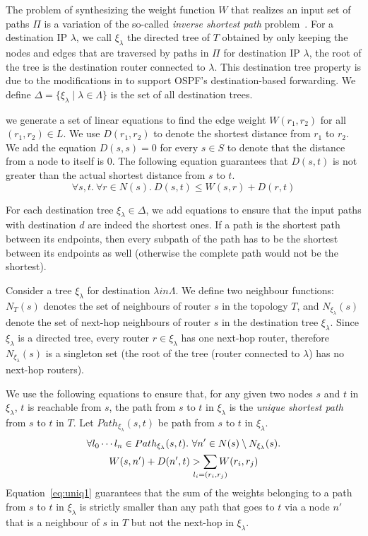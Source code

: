 The problem of synthesizing the weight function $W$ that
realizes an input set of paths $\Pi$ is
a
variation of the so-called {\em inverse shortest path} 
problem~\cite{isp}. 
For a destination IP $\lambda$, we call $\xi_\lambda$ 
the directed tree of $T$ 
obtained by only keeping the nodes and edges 
that are traversed by paths in $\Pi$ for 
destination IP $\lambda$, the root of the tree
is the destination router connected to $\lambda$. 
 This destination tree
 property is due to the modifications in \genesis
 to support OSPF's destination-based forwarding. We
 define $\Delta=\{\xi_\lambda\mid \lambda \in \Lambda\}$ is   
the set of all destination trees. 


we generate a set of linear equations
to find the edge weight $W(r_1, r_2)$ 
for all $(r_1, r_2) \in L$.
We use 
$D(r_1, r_2)$ to denote the 
shortest distance from $r_1$ to $r_2$.
We add the equation $D(s,s) = 0$ 
for every $s\in S$ to denote that the distance
from a node to itself is $0$.
The
following equation guarantees that $D(s,t)$ is not greater than 
the actual shortest distance from $s$ to $t$.
\begin{equation} \label{eq:dist}
\forall s, t. ~\forall r \in N(s).~
D(s, t) \leq W(s, r) + D(r, t)
\end{equation}

For each destination tree $\xi_\lambda\in\Delta$, we add equations to ensure 
that the input paths with destination $d$ are indeed the shortest ones.
If a path
is the shortest path between its endpoints, then every 
subpath of the path has to be the shortest between its endpoints
as well (otherwise the complete path would not be the shortest).

Consider a tree $\xi_\lambda$ for destination $\lambda in \Lambda$. We define two neighbour
functions: $N_T(s)$ denotes the set of neighbours of router $s$ 
in the topology $T$, and $N_{\xi_\lambda}(s)$ denote the set of
next-hop neighbours of router $s$ in the destination tree $\xi_\lambda$.
Since $\xi_\lambda$ is a directed tree, every router $r \in \xi_\lambda$
has one next-hop router, therefore $N_{\xi_\lambda}(s)$ is a singleton
set (the root of the tree (router connected to $\lambda$) has no next-hop
routers).

We use the following equations to ensure that, for any 
given two nodes $s$ and $t$ in
$\xi_\lambda$, $t$ is reachable from $s$, 
the path from $s$ to $t$ in $\xi_\lambda$ is the 
\emph{unique shortest path} from $s$ to $t$ in $T$.
Let $Path_{\xi_\lambda}(s,t)$ be path from $s$ to $t$ in $\xi_\lambda$.
\begin{multline} \label{eq:uniq1}
\forall l_0\cdots l_n\in Path_{\xi_\lambda}(s,t).
~\forall n' \in N(s) \setminus N_{\xi_\lambda}(s). \\
W(s, n') + D(n', t) > \sum_{\mathclap{\substack{l_i=(r_i,r_j)}}} 
W(r_i, r_j) 
\end{multline}
Equation~\ref{eq:uniq1} guarantees that 
the sum of the weights belonging to a path from $s$ to $t$ in $\xi_\lambda$ 
is strictly smaller than 
any path that goes to $t$ via 
a node $n'$ that is a neighbour of $s$ in $T$ but not 
the next-hop in $\xi_\lambda$.

